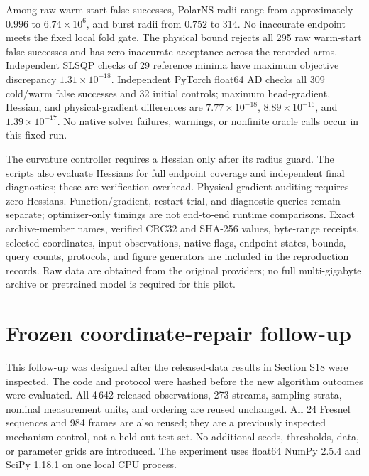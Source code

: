 Among raw warm-start false successes, PolarNS radii range from approximately $0.996$ to $6.74\times10^6$, and burst radii from $0.752$ to $314$. No inaccurate endpoint meets the fixed local fold gate. The physical bound rejects all 295 raw warm-start false successes and has zero inaccurate acceptance across the recorded arms. Independent SLSQP checks of 29 reference minima have maximum objective discrepancy $1.31\times10^{-18}$. Independent PyTorch float64 AD checks all 309 cold/warm false successes and 32 initial controls; maximum head-gradient, Hessian, and physical-gradient differences are $7.77\times10^{-18}$, $8.89\times10^{-16}$, and $1.39\times10^{-17}$. No native solver failures, warnings, or nonfinite oracle calls occur in this fixed run.

The curvature controller requires a Hessian only after its radius guard. The scripts also evaluate Hessians for full endpoint coverage and independent final diagnostics; these are verification overhead. Physical-gradient auditing requires zero Hessians. Function/gradient, restart-trial, and diagnostic queries remain separate; optimizer-only timings are not end-to-end runtime comparisons. Exact archive-member names, verified CRC32 and SHA-256 values, byte-range receipts, selected coordinates, input observations, native flags, endpoint states, bounds, query counts, protocols, and figure generators are included in the reproduction records. Raw data are obtained from the original providers; no full multi-gigabyte archive or pretrained model is required for this pilot.


\section{Frozen coordinate-repair follow-up}
\label{SI-sec:schartrepair}
This follow-up was designed after the released-data results in Section S18 were inspected. The code and protocol were hashed before the new algorithm outcomes were evaluated. All 4\,642 released observations, 273 streams, sampling strata, nominal measurement units, and ordering are reused unchanged. All 24 Fresnel sequences and 984 frames are also reused; they are a previously inspected mechanism control, not a held-out test set. No additional seeds, thresholds, data, or parameter grids are introduced. The experiment uses float64 NumPy 2.5.4 and SciPy 1.18.1 on one local CPU process.

